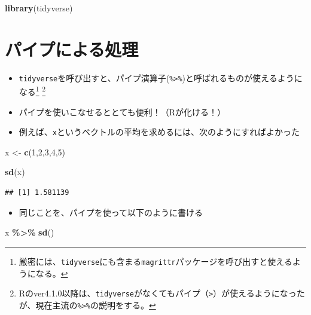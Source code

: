 \documentclass[
]{book}
\newenvironment{Shaded}{\begin{snugshade}}{\end{snugshade}}
\newcommand{\DecValTok}[1]{\textcolor[rgb]{0.00,0.00,0.81}{#1}}
\newcommand{\FunctionTok}[1]{\textcolor[rgb]{0.13,0.29,0.53}{\textbf{#1}}}
\newcommand{\NormalTok}[1]{#1}
\newcommand{\OtherTok}[1]{\textcolor[rgb]{0.56,0.35,0.01}{#1}}
\newcommand{\SpecialCharTok}[1]{\textcolor[rgb]{0.81,0.36,0.00}{\textbf{#1}}}
\providecommand{\tightlist}{%
  \setlength{\itemsep}{0pt}\setlength{\parskip}{0pt}}
\begin{document}
\begin{Shaded}
\begin{Highlighting}[]
\FunctionTok{library}\NormalTok{(tidyverse)}
\end{Highlighting}
\end{Shaded}

\hypertarget{ux30d1ux30a4ux30d7ux306bux3088ux308bux51e6ux7406}{%
\section{パイプによる処理}\label{ux30d1ux30a4ux30d7ux306bux3088ux308bux51e6ux7406}}

\begin{itemize}
\tightlist
\item
  \texttt{tidyverse}を呼び出すと、パイプ演算子(\texttt{\%\textgreater{}\%})と呼ばれるものが使えるようになる\footnote{厳密には、\texttt{tidyverse}にも含まる\texttt{magrittr}パッケージを呼び出すと使えるようになる。} \footnote{Rのver4.1.0以降は、\texttt{tidyverse}がなくてもパイプ（\texttt{\textbar{}\textgreater{}}）が使えるようになったが、現在主流の\texttt{\%\textgreater{}\%}の説明をする。}
\item
  パイプを使いこなせるととても便利！（Rが化ける！）
\item
  例えば、\texttt{x}というベクトルの平均を求めるには、次のようにすればよかった
\end{itemize}

\begin{Shaded}
\begin{Highlighting}[]
\NormalTok{x }\OtherTok{\textless{}{-}} \FunctionTok{c}\NormalTok{(}\DecValTok{1}\NormalTok{,}\DecValTok{2}\NormalTok{,}\DecValTok{3}\NormalTok{,}\DecValTok{4}\NormalTok{,}\DecValTok{5}\NormalTok{)}

\FunctionTok{sd}\NormalTok{(x)}
\end{Highlighting}
\end{Shaded}

\begin{verbatim}
## [1] 1.581139
\end{verbatim}

\begin{itemize}
\tightlist
\item
  同じことを、パイプを使って以下のように書ける
\end{itemize}

\begin{Shaded}
\begin{Highlighting}[]
\NormalTok{x }\SpecialCharTok{\%\textgreater{}\%} \FunctionTok{sd}\NormalTok{()}
\end{Highlighting}
\end{Shaded}
\end{document}
